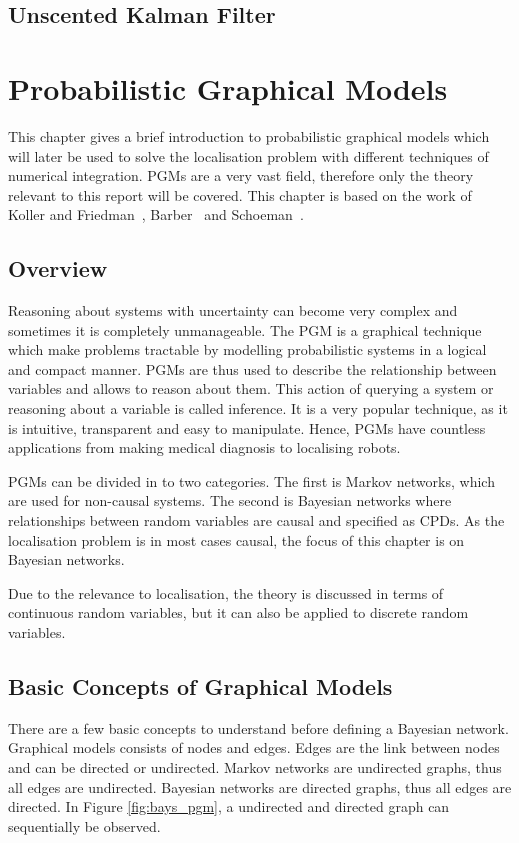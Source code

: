 \documentclass[12pt,oneside,openany,a4paper, %
afrikaans,english,
]{memoir}
\numberwithin{equation}{chapter}
\begin{document}
\section{Unscented Kalman Filter}
\chapter{Probabilistic Graphical Models}
This chapter gives a brief introduction to probabilistic graphical models which will later be used to solve the localisation problem with different techniques of numerical integration. PGMs are a very vast field, therefore only the theory relevant to this report will be covered. This chapter is based on the work of Koller and Friedman~\cite{koller}, Barber~\cite{barber} and Schoeman~\citep{JC}.
\section{Overview}
Reasoning about systems with uncertainty can become very complex and sometimes it is completely unmanageable. The PGM is a graphical technique which make problems tractable by modelling probabilistic systems in a logical and compact manner. PGMs are thus used to describe the relationship between variables and allows to reason about them. This action of querying a system or reasoning about a variable is called inference. It is a very popular technique, as it is intuitive, transparent and easy to manipulate. Hence, PGMs have countless applications from making medical diagnosis to localising robots.

PGMs can be divided in to two categories. The first is Markov networks, which are used for non-causal systems. The second is Bayesian networks where relationships between random variables are causal and specified as CPDs. As the localisation problem is in most cases causal, the focus of this chapter is on Bayesian networks.

Due to the relevance to localisation, the theory is discussed in terms of continuous random variables, but it can also be applied to discrete random variables. 
\section{Basic Concepts of Graphical Models}
There are a few basic concepts to understand before defining a Bayesian network. Graphical models consists of nodes and edges. Edges are the link between nodes and can be directed or undirected. Markov networks are undirected graphs, thus all edges are undirected. Bayesian networks are directed graphs, thus all edges are directed. In Figure \ref{fig:bays_pgm}, a undirected and directed graph can sequentially be observed.
\end{document}

